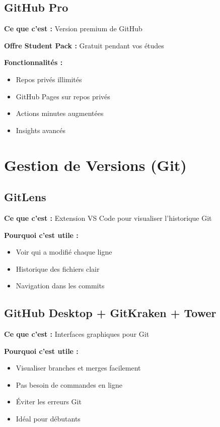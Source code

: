 \documentclass[11pt,a4paper]{article}
\begin{document}
\subsection{GitHub Pro}

\textbf{Ce que c'est :} Version premium de GitHub

\textbf{Offre Student Pack :} Gratuit pendant vos études

\textbf{Fonctionnalités :}
\begin{itemize}
    \item Repos privés illimités
    \item GitHub Pages sur repos privés
    \item Actions minutes augmentées
    \item Insights avancés
\end{itemize}

\newpage
\section{Gestion de Versions (Git)}

\subsection{GitLens}

\textbf{Ce que c'est :} Extension VS Code pour visualiser l'historique Git

\textbf{Pourquoi c'est utile :}
\begin{itemize}
    \item Voir qui a modifié chaque ligne
    \item Historique des fichiers clair
    \item Navigation dans les commits
\end{itemize}

\subsection{GitHub Desktop + GitKraken + Tower}

\textbf{Ce que c'est :} Interfaces graphiques pour Git

\textbf{Pourquoi c'est utile :}
\begin{itemize}
    \item Visualiser branches et merges facilement
    \item Pas besoin de commandes en ligne
    \item Éviter les erreurs Git
    \item Idéal pour débutants
\end{itemize}
\end{document}
